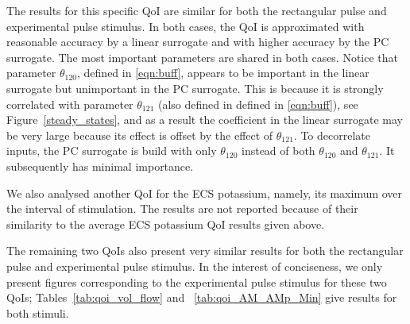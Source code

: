 The results for this specific QoI are similar for both the rectangular pulse and experimental pulse stimulus. In both cases, the QoI is approximated with reasonable accuracy by a linear surrogate and with higher accuracy by the PC surrogate. The most important parameters are shared in both cases. Notice that parameter $\theta_{120}$, defined in \eqref{eqn:buff}, appears to be important in the linear surrogate but unimportant in the PC surrogate. This is because it is strongly correlated with parameter $\theta_{121}$ (also defined in defined in \eqref{eqn:buff}), see Figure~\ref{steady_states}, and as a result the coefficient in the linear surrogate may be very large because its effect is offset by the effect of $\theta_{121}$. To decorrelate inputs, the PC surrogate is build with only $\theta_{120}$ instead of both $\theta_{120}$ and $\theta_{121}$. It subsequently has minimal importance.

We also analysed another QoI for the ECS potassium, namely, its maximum over the interval of stimulation. The results are not reported because of their similarity to the average ECS potassium QoI results given above.

The remaining two QoIs also present very similar results for both the rectangular pulse and experimental pulse stimulus. In the interest of conciseness, we only present figures corresponding to the experimental pulse stimulus for these two QoIs; Tables~\ref{tab:qoi_vol_flow} and ~\ref{tab:qoi_AM_AMp_Min} give results for both stimuli. 

